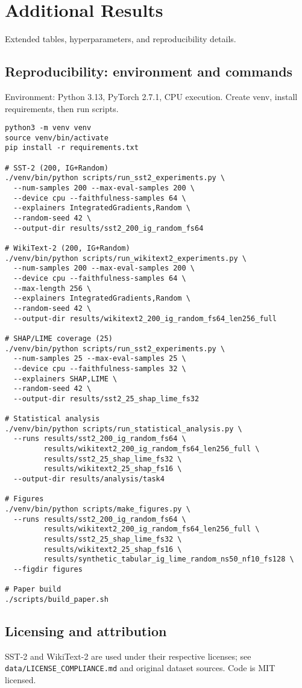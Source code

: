 \section*{Additional Results}
Extended tables, hyperparameters, and reproducibility details.

\subsection*{Reproducibility: environment and commands}
Environment: Python 3.13, PyTorch 2.7.1, CPU execution. Create venv, install requirements, then run scripts.

\begin{verbatim}
python3 -m venv venv
source venv/bin/activate
pip install -r requirements.txt

# SST-2 (200, IG+Random)
./venv/bin/python scripts/run_sst2_experiments.py \
  --num-samples 200 --max-eval-samples 200 \
  --device cpu --faithfulness-samples 64 \
  --explainers IntegratedGradients,Random \
  --random-seed 42 \
  --output-dir results/sst2_200_ig_random_fs64

# WikiText-2 (200, IG+Random)
./venv/bin/python scripts/run_wikitext2_experiments.py \
  --num-samples 200 --max-eval-samples 200 \
  --device cpu --faithfulness-samples 64 \
  --max-length 256 \
  --explainers IntegratedGradients,Random \
  --random-seed 42 \
  --output-dir results/wikitext2_200_ig_random_fs64_len256_full

# SHAP/LIME coverage (25)
./venv/bin/python scripts/run_sst2_experiments.py \
  --num-samples 25 --max-eval-samples 25 \
  --device cpu --faithfulness-samples 32 \
  --explainers SHAP,LIME \
  --random-seed 42 \
  --output-dir results/sst2_25_shap_lime_fs32

# Statistical analysis
./venv/bin/python scripts/run_statistical_analysis.py \
  --runs results/sst2_200_ig_random_fs64 \
         results/wikitext2_200_ig_random_fs64_len256_full \
         results/sst2_25_shap_lime_fs32 \
         results/wikitext2_25_shap_fs16 \
  --output-dir results/analysis/task4

# Figures
./venv/bin/python scripts/make_figures.py \
  --runs results/sst2_200_ig_random_fs64 \
         results/wikitext2_200_ig_random_fs64_len256_full \
         results/sst2_25_shap_lime_fs32 \
         results/wikitext2_25_shap_fs16 \
         results/synthetic_tabular_ig_lime_random_ns50_nf10_fs128 \
  --figdir figures

# Paper build
./scripts/build_paper.sh
\end{verbatim}

\subsection*{Licensing and attribution}
SST-2 and WikiText-2 are used under their respective licenses; see \texttt{data/LICENSE\_COMPLIANCE.md} and original dataset sources. Code is MIT licensed.

